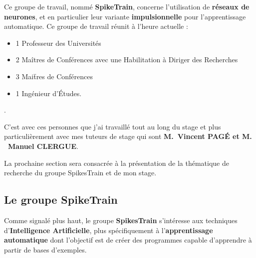 Ce groupe de travail, nommé \textbf{SpikeTrain}, concerne l'utilisation de
\textbf{réseaux de neurones}, et en particulier leur variante
\textbf{impulsionnelle} pour l'apprentissage automatique.
Ce groupe de travail réunit à l'heure actuelle :

\begin{itemize}
\tightlist
\item
  1 Professeur des Universités
\item
  2 Maîtres de Conférences avec une Habilitation à Diriger des Recherches
\item
  3 Maiẗres de Conférences
\item
  1 Ingénieur d'\'Etudes.
\end{itemize}.

C'est avec ces personnes que j'ai travaillé tout au long du stage et plus particulièrement avec mes
tuteurs de stage qui sont  \textbf{M.~Vincent PAGÉ et M. ~Manuel CLERGUE}.

%

La prochaine section sera consacrée à la présentation de la thématique
de recherche du groupe SpikesTrain et de mon stage.

\hypertarget{Objectif_Spike}{%
\subsection{Le groupe SpikeTrain}\label{Groupe_Spiketrain}}

Comme signalé plus haut, le groupe \textbf{SpikesTrain} s'intéresse aux
techniques d'\textbf{Intelligence Artificielle}, plus spécifiquement à
l'\textbf{apprentissage automatique} dont l'objectif est de créer des
programmes capable d'apprendre à partir de bases d'exemples.

